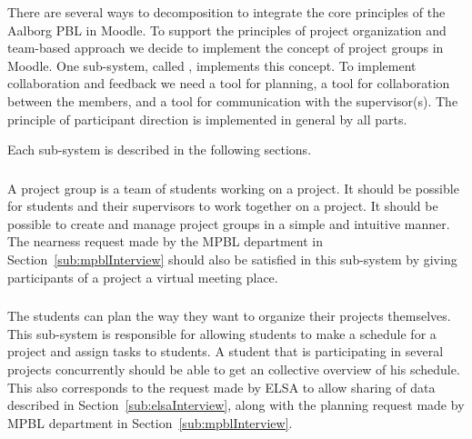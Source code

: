 There are several ways to decomposition \system{} to integrate the core principles of the Aalborg PBL in Moodle. 
To support the principles of project organization and team-based approach we decide to implement the concept of project groups in Moodle. 
One sub-system, called \administrationgroup{}, implements this concept.
To implement collaboration and feedback we need a tool for planning, a tool for collaboration between the members, and a tool for communication with the supervisor(s). 
The principle of participant direction is implemented in general by all parts. 

Each sub-system is described in the following sections. %


\subsubsection{\administrationgroup{}} %
\label{sec:admgroupdecom}
A project group is a team of students working on a project.
It should be possible for students and their supervisors to work together on a project.
It should be possible to create and manage project groups in a simple and intuitive manner.
The nearness request made by the MPBL department in Section~\ref{sub:mpblInterview} should also be satisfied in this sub-system by giving participants of a project a virtual meeting place.

\subsubsection{\timelinegroup{}} %
The students can plan the way they want to organize their projects themselves.
This sub-system is responsible for allowing students to make a schedule for a project and assign tasks to students.
A student that is participating in several projects concurrently should be able to get an collective overview of his schedule.%
This also corresponds to the request made by ELSA to allow sharing of data described in Section~\ref{sub:elsaInterview}, along with the planning request made by MPBL department in Section~\ref{sub:mpblInterview}.

